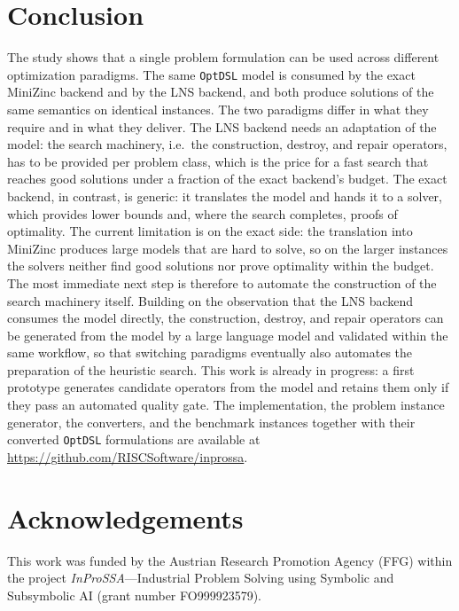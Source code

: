 \documentclass[11pt,a4paper]{article}
\begin{document}
\section{Conclusion}
The study shows that a single problem formulation can be used across different
optimization paradigms.
The same \texttt{OptDSL} model is consumed by the exact MiniZinc backend and by
the LNS backend, and both produce solutions of the same semantics on identical
instances.
The two paradigms differ in what they require and in what they deliver.
The LNS backend needs an adaptation of the model: the search machinery, i.e.\
the construction, destroy, and repair operators, has to be provided per problem
class, which is the price for a fast search that reaches good solutions under a
fraction of the exact backend's budget.
The exact backend, in contrast, is generic: it translates the model and hands
it to a solver, which provides lower bounds and, where the search completes,
proofs of optimality.
The current limitation is on the exact side: the translation into MiniZinc
produces large models that are hard to solve, so on the larger instances the
solvers neither find good solutions nor prove optimality within the budget.
The most immediate next step is therefore to automate the construction of the
search machinery itself.
Building on the observation that the LNS backend consumes the model directly,
the construction, destroy, and repair operators can be generated from the model
by a large language model and validated within the same workflow, so that
switching paradigms eventually also automates the preparation of the heuristic
search.
This work is already in progress: a first prototype generates candidate
operators from the model and retains them only if they pass an automated
quality gate.
The implementation, the problem instance generator, the converters, and the
benchmark instances together with their converted \texttt{OptDSL} formulations
are available at \url{https://github.com/RISCSoftware/inprossa}.

\section*{Acknowledgements}
This work was funded by the Austrian Research Promotion Agency (FFG) within
the project \emph{InProSSA}---Industrial Problem Solving using Symbolic and
Subsymbolic AI (grant number FO999923579).



\end{document}
